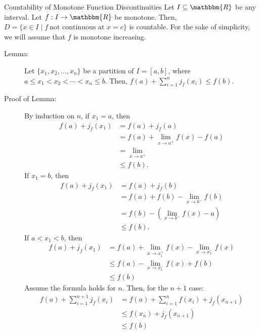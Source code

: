 \documentclass[10pt]{extarticle}
\newcommand{\R}{\mathbbm{R}}
\begin{document}
  \begin{problem}{Countability of Monotone Function Discontinuities}
    Let $I\subseteq \R$ be any interval. Let $f: I\rightarrow \R$ be monotone. Then, $D = \{x\in I\mid f~\text{not continuous at }x=c\}$ is countable.
    \tcblower
    For the sake of simplicity, we will assume that $f$ is monotone increasing.
    \begin{description}
      \item[Lemma:] Let $\{x_1,x_2,\dots,x_n\}$ be a partition of $I = [a,b]$, where $a \leq x_1 < x_2 < \cdots < x_n \leq b$. Then, $f(a) + \sum_{i=1}^{n}j_f(x_i) \leq f(b)$.
      \item[Proof of Lemma:] By induction on $n$, if $x_1 = a$, then
        \begin{align*}
          f(a) + j_f(x_1)&= f(a) + j_f(a)\\
                         &= f(a) + \lim_{x\rightarrow a^{+}}f(x) - f(a)\\
                         &= \lim_{x\rightarrow a^{+}}\\
                         &\leq f(b).
        \end{align*}
        If $x_1 = b$, then
        \begin{align*}
          f(a) + j_f(x_1) &= f(a) + j_f(b)\\
                          &= f(a) + f(b) - \lim_{x\rightarrow b^{-}}f(b)\\
                          &= f(b) - (\lim_{x\rightarrow b^{-}}f(x) - a)\\
                          &\leq f(b).
        \end{align*}
        If $a < x_1 < b$, then
        \begin{align*}
          f(a) + j_f(x_1) &= f(a) + \lim_{x\rightarrow x_1^{+}}f(x) - \lim_{x\rightarrow x_1^{-}}f(x)\\
                          &\leq f(a) - \lim_{x\rightarrow x_1^{-}}f(x) + f(b)\\
                          &\leq f(b)
        \end{align*}
        Assume the formula holds for $n$. Then, for the $n+1$ case:
        \begin{align*}
          f(a) + \sum_{i=1}^{n+1}j_f(x_i) &= f(a) + \sum_{i=1}^{n}f(x_i) + j_f(x_{n+1})\\
                                          &\leq f(x_n) + j_{f}(x_{n+1})\\
                                          &\leq f(b)
        \end{align*}

\end{description}
\end{problem}
\end{document}
